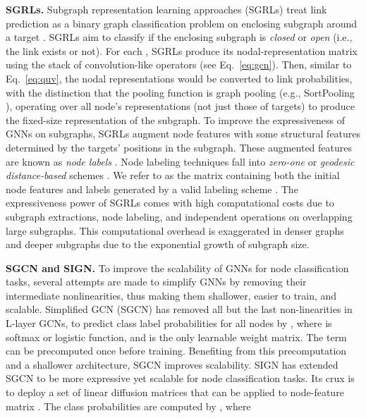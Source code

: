 \documentclass[sigconf, nonacm]{acmart}
\begin{document}
\vskip 1mm
\noindent \textbf{SGRLs.} Subgraph representation learning approaches (SGRLs)  \cite{zhang2017weisfeiler,zhang2018link,zhang2021labeling,yin2022algorithm,louis2022sampling} treat link prediction as a binary graph classification problem on enclosing subgraph  around a target . SGRLs aim to classify if the enclosing subgraph  is \textit{closed} or \textit{open} (i.e., the link exists or not). For each , SGRLs produce its nodal-representation matrix  using the stack of convolution-like operators (see Eq.~\ref{eq:gcn}). Then, similar to Eq.~\ref{eq:quv}, the nodal representations would be converted to link probabilities, with the distinction that the pooling function is graph pooling (e.g., SortPooling \cite{zhang2018end}), operating over all node's representations (not just those of targets) to produce the fixed-size representation of the subgraph. To improve the expressiveness of GNNs on subgraphs, SGRLs augment node features with some structural features determined by the targets' positions in the subgraph. These augmented features are known as \textit{node labels} \cite{zhang2021labeling}. Node labeling techniques fall into \emph{zero-one} or \textit{geodesic distance-based} schemes \cite{huang2022boosting}. We refer to  as the matrix containing both the initial node features and labels generated by a valid labeling scheme \cite{zhang2021labeling}. The expressiveness power of SGRLs comes with high computational costs due to subgraph extractions, node labeling, and independent operations on overlapping large subgraphs. This computational overhead is exaggerated in denser graphs and deeper subgraphs due to the exponential growth of subgraph size. 


\noindent \textbf{SGCN and SIGN.} To improve the scalability of GNNs for node classification tasks, several attempts are made to simplify GNNs by removing their intermediate nonlinearities, thus making them shallower, easier to train, and scalable. Simplified GCN (SGCN) \cite{wu2019simplifying} has removed all but the last non-linearities in L-layer GCNs, to predict class label probabilities  for all nodes by
,
where  is softmax or logistic function, and  is the only learnable weight matrix. The term  can be precomputed once before training. Benefiting from this precomputation and a shallower architecture, SGCN improves scalability. SIGN has extended SGCN to be  more expressive yet scalable for node classification tasks. Its crux is to deploy a set of linear diffusion matrices  that can be applied to node-feature matrix . The class probabilities  are computed by  , where  
\end{document}
